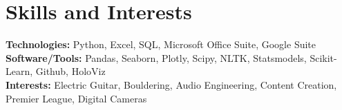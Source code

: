 \documentclass[letterpaper,11pt]{article}
\begin{document}
\section{Skills and Interests}
\textbf{Technologies:} Python, Excel, SQL, Microsoft Office Suite, Google Suite \\
\textbf{Software/Tools:} Pandas, Seaborn, Plotly, Scipy, NLTK, Statsmodels, Scikit-Learn, Github, HoloViz \\
\textbf{Interests:} Electric Guitar, Bouldering, Audio Engineering, Content Creation, Premier League, Digital Cameras
\end{document}
